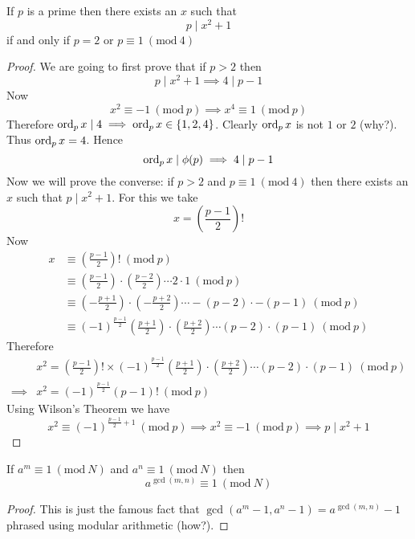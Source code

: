 \documentclass[11pt,numbers=noenddot,svgnames,dvipsnames]{scrartcl}
\renewcommand{\pmod}[1]{\ (\mathrm{mod}\ #1)}
\begin{document}
\begin{theorem}
    If $p$ is a prime then there exists an $x$ such that 
    \[
        p \mid x^{2} + 1
    \]
    if and only if $p = 2$ or $p \equiv 1 \pmod{4}$
\end{theorem}
\begin{proof}
    We are going to first prove that if $p>2$ then 
    \[
        p \mid x^{2} + 1 \implies 4 \mid p - 1
    \]
    Now 
    \[
        x^{2} \equiv -1 \pmod p \implies x^{4} \equiv 1 \pmod p
    \]
    Therefore $\operatorname{ord}_{p} x \mid 4 \implies \operatorname{ord}_{p} x \in \{1, 2, 4\}$. 
    Clearly $\operatorname{ord}_{p}x$ is not $1$ or $2$ (why?). Thus $\operatorname{ord}_{p} x = 4$. 
    Hence
    \[
        \operatorname{ord}_{p} x \mid \phi(p) \implies 4 \mid p - 1
    \]
    Now we will prove the converse: if $p > 2$ and $p \equiv 1 \pmod 4$ then there exists 
    an $x$ such that $p \mid x^{2} + 1$. For this we take 
    \[
        x = \left(\frac{p - 1}{2}\right)!
    \]
    Now 
    \begin{align*}
        x & \equiv \left(\frac{p - 1}{2}\right)! \pmod p \\
          & \equiv \left(\frac{p - 1}{2}\right)\cdot \left(\frac{p - 2}{2}\right) \cdots 2 \cdot 1 \pmod p \\
          & \equiv \left(-\frac{p + 1}{2}\right)\cdot \left(-\frac{p + 2}{2}\right) \cdots -(p - 2) \cdot -(p - 1) \pmod p \\
          & \equiv (-1)^{\frac{p-1}{2}} \left(\frac{p + 1}{2}\right)\cdot \left(\frac{p + 2}{2}\right) \cdots (p - 2) \cdot (p - 1) \pmod p
    \end{align*}
    Therefore 
    \begin{align*}
        & x^{2} = \left(\frac{p - 1}{2}\right)! 
        \times (-1)^{\frac{p-1}{2}} \left(\frac{p + 1}{2}\right)\cdot \left(\frac{p + 2}{2}\right) \cdots (p - 2) \cdot (p - 1) \pmod p \\
        \implies & x^{2} = (-1)^{\frac{p - 1}{2}}(p - 1)! \pmod p
    \end{align*}
    Using Wilson's Theorem we have 
    \[
        x^{2} \equiv (-1)^{\frac{p-1}{2} + 1} \pmod p \implies x^{2} \equiv -1 \pmod p \implies p \mid x^{2} + 1
    \]
\end{proof}

\begin{lemma}
    If $a^{m} \equiv 1 \pmod N$ and $a^{n} \equiv 1 \pmod N$ then 
    \[
        a^{\gcd(m, n)} \equiv 1 \pmod N
    \]
\end{lemma}
\begin{proof}
    This is just the famous fact that $\gcd(a^{m} - 1, a^{n} - 1) = a^{\gcd(m, n)} - 1$ 
    phrased using modular arithmetic (how?). 
\end{proof}
\end{document}

